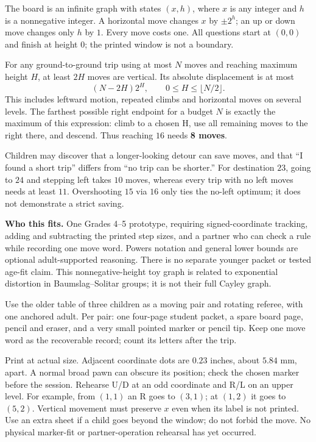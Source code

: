 \documentclass[11pt,letterpaper]{article}
\newcommand{\sect}[1]{\par\vspace{5pt}{\large\bfseries #1}\par}
\begin{document}
\sect{The mathematics first}
The board is an infinite graph with states $(x,h)$, where $x$ is any integer and
$h$ is a nonnegative integer. A horizontal move changes $x$ by $\pm2^h$;
an up or down move changes only $h$ by $1$. Every move costs one. All questions
start at $(0,0)$ and finish at height $0$; the printed window is not a boundary.

For any ground-to-ground trip using at most $N$ moves and reaching maximum
height $H$, at least $2H$ moves are vertical. Its absolute displacement is at most
\[
 (N-2H)2^H,\qquad 0\le H\le\lfloor N/2\rfloor.
\]
This includes leftward motion, repeated climbs and horizontal moves on several
levels. The farthest possible right endpoint for a budget $N$ is exactly the
maximum of this expression: climb to a chosen H, use all remaining moves to the
right there, and descend. Thus reaching $16$ needs \textbf{8 moves}.

Children may discover that a longer-looking detour can save moves, and that
``I found a short trip'' differs from ``no trip can be shorter.'' For destination
$23$, going to $24$ and stepping left takes $10$ moves, whereas every trip with
no left moves needs at least $11$. Overshooting $15$ via $16$ only ties the
no-left optimum; it does not demonstrate a strict saving.

\textbf{Who this fits.} One Grades 4--5 prototype, requiring signed-coordinate
tracking, adding and subtracting the printed step sizes, and a partner who can check a rule
while recording one move word. Powers notation and general lower bounds are
optional adult-supported reasoning. There is no separate younger packet or
tested age-fit claim. This nonnegative-height toy graph is related to exponential
distortion in Baumslag--Solitar groups; it is not their full Cayley graph.

\sect{Materials and preparation}
Use the older table of three children as a moving pair and rotating referee,
with one anchored adult. Per pair: one four-page student packet, a spare board
page, pencil and eraser, and a very small pointed marker or pencil tip. Keep one
move word as the recoverable record; count its letters after the trip.

Print at actual size. Adjacent coordinate dots are $0.23$ inches, about
$5.84$ mm, apart. A normal broad pawn can obscure its position; check the chosen
marker before the session. Rehearse U/D at an odd coordinate and R/L on an upper
level. For example, from $(1,1)$ an R goes to $(3,1)$; at $(1,2)$ it goes to
$(5,2)$. Vertical movement must preserve $x$ even when its label is not printed.
Use an extra sheet if a child goes beyond the window; do not forbid the move.
No physical marker-fit or partner-operation rehearsal has yet occurred.
\end{document}
